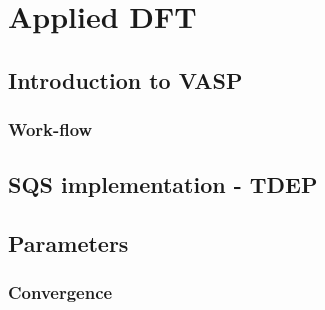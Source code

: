 \chapter{Applied DFT}
\label{sec:Implementation}

\section{Introduction to VASP}

\subsection{Work-flow}

\section{SQS implementation - TDEP}


\section{Parameters}
\subsection{Convergence}
